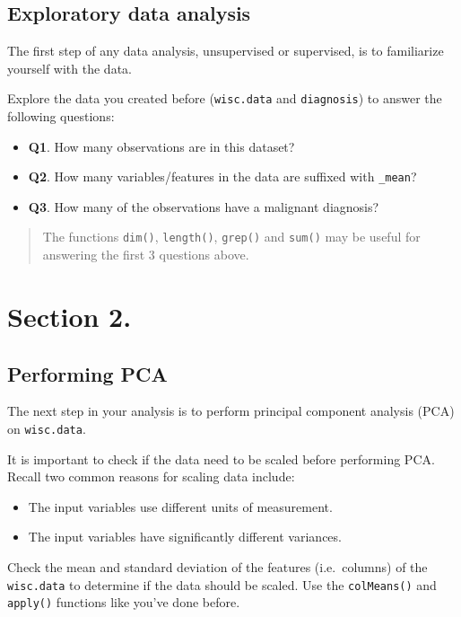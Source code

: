 \documentclass[]{article}
\providecommand{\tightlist}{%
  \setlength{\itemsep}{0pt}\setlength{\parskip}{0pt}}
\begin{document}
\subsection{Exploratory data analysis}\label{exploratory-data-analysis}

The first step of any data analysis, unsupervised or supervised, is to
familiarize yourself with the data.

Explore the data you created before (\texttt{wisc.data} and
\texttt{diagnosis}) to answer the following questions:

\begin{itemize}
\tightlist
\item
  \textbf{Q1}. How many observations are in this dataset?
\item
  \textbf{Q2}. How many variables/features in the data are suffixed with
  \texttt{\_mean}?
\item
  \textbf{Q3}. How many of the observations have a malignant diagnosis?
\end{itemize}

\begin{quote}
The functions \texttt{dim()}, \texttt{length()}, \texttt{grep()} and
\texttt{sum()} may be useful for answering the first 3 questions above.
\end{quote}

\section{Section 2.}\label{section-2.}

\subsection{Performing PCA}\label{performing-pca}

The next step in your analysis is to perform principal component
analysis (PCA) on \texttt{wisc.data}.

It is important to check if the data need to be scaled before performing
PCA. Recall two common reasons for scaling data include:

\begin{itemize}
\tightlist
\item
  The input variables use different units of measurement.
\item
  The input variables have significantly different variances.
\end{itemize}

Check the mean and standard deviation of the features (i.e.~columns) of
the \texttt{wisc.data} to determine if the data should be scaled. Use
the \texttt{colMeans()} and \texttt{apply()} functions like you've done
before.
\end{document}
